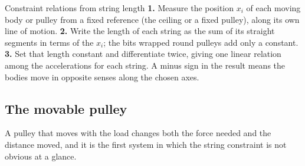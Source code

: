 \begin{methodbox}{Constraint relations from string length}
\textbf{1.} Measure the position $x_i$ of each moving body or pulley from a fixed reference (the ceiling
or a fixed pulley), along its own line of motion. \textbf{2.} Write the length of each string as the sum
of its straight segments in terms of the $x_i$; the bits wrapped round pulleys add only a constant.
\textbf{3.} Set that length constant and differentiate twice, giving one linear relation among the
accelerations for each string. A minus sign in the result means the bodies move in opposite senses
along the chosen axes.
\end{methodbox}

\subsection{The movable pulley}

A pulley that moves with the load changes both the force needed and the distance moved, and it is the first
system in which the string constraint is not obvious at a glance.

\begin{figure}[htbp]
\centering
{}
\end{figure}


